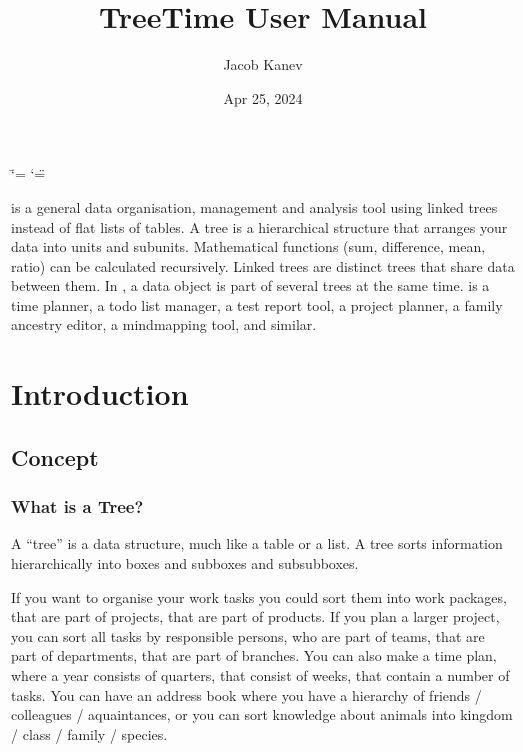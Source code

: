 \documentclass[letterpaper,10pt,english]{sphinxmanual}
\title{TreeTime User Manual}
\date{Apr 25, 2024}
\author{Jacob Kanev}
\begin{document}
\ifdefined\shorthandoff
  \ifnum\catcode`\=\string=\active\shorthandoff{=}\fi
  \ifnum\catcode`\"=\active{}\fi
\fi

\pagestyle{empty}
\sphinxmaketitle
\pagestyle{plain}
\sphinxtableofcontents
\pagestyle{normal}
\label{\detokenize{index::doc}}

\sphinxAtStartPar
{} is a general data organisation, management and analysis tool using linked trees instead of flat lists of tables.
A tree is a hierarchical structure that arranges your data into units and sub\sphinxhyphen{}units.
Mathematical functions (sum, difference, mean, ratio) can be calculated recursively.
Linked trees are distinct trees that share data between them.
In , a data object is part of several trees at the same time.
 is a time planner, a to\sphinxhyphen{}do list manager, a test report tool, a project planner, a family ancestry editor, a mind\sphinxhyphen{}mapping tool, and similar.



\sphinxstepscope


\chapter{Introduction}
\label{\detokenize{introduction:introduction}}\label{\detokenize{introduction::doc}}

\section{Concept}
\label{\detokenize{introduction:concept}}

\subsection{What is a Tree?}
\label{\detokenize{introduction:what-is-a-tree}}
\sphinxAtStartPar
A “tree” is a data structure, much like a table or a list.
A tree sorts information hierarchically into boxes and sub\sphinxhyphen{}boxes and sub\sphinxhyphen{}sub\sphinxhyphen{}boxes.

\sphinxAtStartPar
If you want to organise your work tasks you could sort them into work packages, that are part of projects, that are part of products.
If you plan a larger project, you can sort all tasks by responsible persons, who are part of teams, that are part of departments, that are part of branches.
You can also make a time plan, where a year consists of quarters, that consist of weeks, that contain a number of tasks.
You can have an address book where you have a hierarchy of friends / colleagues / aquaintances, or you can sort knowledge about animals into kingdom / class / family / species.
\end{document}
